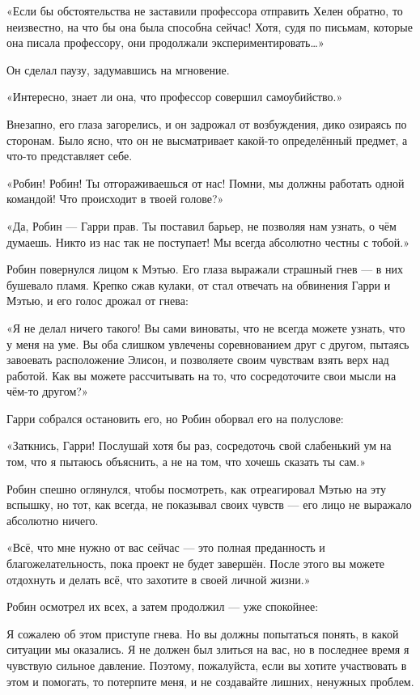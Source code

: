 \documentclass[a5paper, 9pt,
final, openany, twoside=true]{memoir}
\begin{document}
«Если бы обстоятельства не заставили профессора отправить Хелен обратно, то неизвестно, на что бы она была способна сейчас! Хотя, судя по письмам, которые она писала профессору, они продолжали экспериментировать…»

Он сделал паузу, задумавшись на мгновение.

«Интересно, знает ли она, что профессор совершил самоубийство.»

Внезапно, его глаза загорелись, и он задрожал от возбуждения, дико озираясь по сторонам. Было ясно, что он не высматривает какой-то определённый предмет, а что-то представляет себе.

«Робин! Робин! Ты отгораживаешься от нас! Помни, мы должны работать одной командой! Что происходит в твоей голове?»

«Да, Робин — Гарри прав. Ты поставил барьер, не позволяя нам узнать, о чём думаешь. Никто из нас так не поступает! Мы всегда абсолютно честны с тобой.»

Робин повернулся лицом к Мэтью. Его глаза выражали страшный гнев — в них бушевало пламя. Крепко сжав кулаки, от стал отвечать на обвинения Гарри и Мэтью, и его голос дрожал от гнева:

«Я не делал ничего такого! Вы сами виноваты, что не всегда можете узнать, что у меня на уме. Вы оба слишком увлечены соревнованием друг с другом, пытаясь завоевать расположение Элисон, и позволяете своим чувствам взять верх над работой. Как вы можете рассчитывать на то, что сосредоточите свои мысли на чём-то другом?»

Гарри собрался остановить его, но Робин оборвал его на полуслове:

«Заткнись, Гарри! Послушай хотя бы раз, сосредоточь свой слабенький ум на том, что я пытаюсь объяснить, а не на том, что хочешь сказать ты сам.»

Робин спешно оглянулся, чтобы посмотреть, как отреагировал Мэтью на эту вспышку, но тот, как всегда, не показывал своих чувств — его лицо не выражало абсолютно ничего.

«Всё, что мне нужно от вас сейчас — это полная преданность и благожелательность, пока проект не будет завершён. После этого вы можете отдохнуть и делать всё, что захотите в своей личной жизни.»

Робин осмотрел их всех, а затем продолжил — уже спокойнее:

Я сожалею об этом приступе гнева. Но вы должны попытаться понять, в какой ситуации мы оказались. Я не должен был злиться на вас, но в последнее время я чувствую сильное давление. Поэтому, пожалуйста, если вы хотите участвовать в этом и помогать, то потерпите меня, и не создавайте лишних, ненужных проблем.
\end{document}
